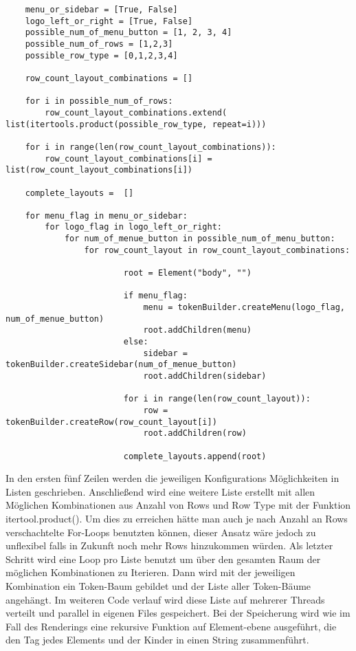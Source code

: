 \documentclass[pdftex,a4paper,halfparskip]{scrartcl}
\begin{document}
\begin{verbatim}
    menu_or_sidebar = [True, False]
    logo_left_or_right = [True, False]
    possible_num_of_menu_button = [1, 2, 3, 4]
    possible_num_of_rows = [1,2,3]
    possible_row_type = [0,1,2,3,4]

    row_count_layout_combinations = []

    for i in possible_num_of_rows:
        row_count_layout_combinations.extend( list(itertools.product(possible_row_type, repeat=i)))

    for i in range(len(row_count_layout_combinations)):
        row_count_layout_combinations[i] = list(row_count_layout_combinations[i])

    complete_layouts =  []

    for menu_flag in menu_or_sidebar:
        for logo_flag in logo_left_or_right:
            for num_of_menue_button in possible_num_of_menu_button:
                for row_count_layout in row_count_layout_combinations:

                        root = Element("body", "")

                        if menu_flag:
                            menu = tokenBuilder.createMenu(logo_flag, num_of_menue_button)
                            root.addChildren(menu)
                        else:
                            sidebar = tokenBuilder.createSidebar(num_of_menue_button)
                            root.addChildren(sidebar)

                        for i in range(len(row_count_layout)):
                            row = tokenBuilder.createRow(row_count_layout[i])
                            root.addChildren(row)

                        complete_layouts.append(root)
\end{verbatim}

In den ersten fünf Zeilen werden die jeweiligen Konfigurations Möglichkeiten in Listen geschrieben. Anschließend wird eine weitere Liste erstellt mit allen Möglichen Kombinationen aus Anzahl von Rows und Row Type mit der Funktion itertool.product(). Um dies zu erreichen hätte man auch je nach Anzahl an Rows verschachtelte For-Loops benutzten können, dieser Ansatz wäre jedoch zu unflexibel falls in Zukunft noch mehr Rows hinzukommen würden.
Als letzter Schritt wird eine Loop pro Liste benutzt um über den gesamten Raum der möglichen Kombinationen zu Iterieren. Dann wird mit der jeweiligen Kombination ein Token-Baum gebildet und der Liste aller Token-Bäume angehängt. Im weiteren Code verlauf wird diese Liste auf mehrerer Threads verteilt und parallel in eigenen Files gespeichert.
Bei der Speicherung wird wie im Fall des Renderings eine rekursive Funktion auf Element-ebene ausgeführt, die den Tag jedes Elements und der Kinder in einen String zusammenführt.
\end{document}
